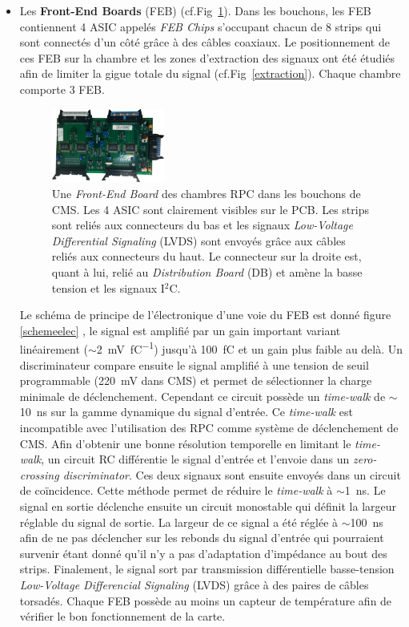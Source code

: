 \begin{itemize}[label=$\bullet$]
	\item Les \textbf{Front-End Boards} (FEB) (cf.Fig~\ref{Feb}). Dans les bouchons, les FEB contiennent \num{4} ASIC appelés \textit{FEB Chips} s'occupant chacun de \num{8} strips qui sont connectés d'un côté grâce à des câbles coaxiaux. Le positionnement de ces FEB sur la chambre et les zones d'extraction des signaux ont été étudiés afin de limiter la gigue totale du signal (cf.Fig~\ref{extraction}). Chaque chambre comporte \num{3} FEB.
	
	\begin{figure}[ht!]
		\centering
		\includegraphics[width=0.35\textwidth]{RPC/Feb.png}
		\captionsetup{type=subfigure}\caption{Une \textit{Front-End Board }des chambres RPC dans les bouchons de CMS. Les \num{4} ASIC sont clairement visibles sur le PCB. Les strips sont reliés aux connecteurs du bas et les signaux \textit{Low-Voltage Differential Signaling} (LVDS) sont envoyés grâce aux câbles reliés aux connecteurs du haut. Le connecteur sur la droite est, quant à lui, relié au \textit{Distribution Board} (DB) et amène la basse tension et les signaux I$^2$C.}
		\label{Feb}
	\end{figure}

	Le schéma de principe de l'électronique d'une voie du FEB est donné figure \ref{schemeelec} \cite{electro}, le signal est amplifié par un gain important variant linéairement ($\sim$\SI{2}{\milli\volt\per\femto\coulomb}) jusqu'à \SI{100}{\femto\coulomb} et un gain plus faible au delà. Un discriminateur compare ensuite le signal amplifié à une tension de seuil programmable (\SI{220}{\milli\volt} dans CMS) et permet de sélectionner la charge minimale de déclenchement. Cependant ce circuit possède un \textit{time-walk} de $\sim$\SI{10}{\nano\second} sur la gamme dynamique du signal d'entrée. Ce \textit{time-walk} est incompatible avec l'utilisation des RPC comme système de déclenchement de CMS. Afin d'obtenir une bonne résolution temporelle en limitant le \textit{time-walk}, un circuit RC différentie le signal d'entrée et l'envoie dans un \textit{zero-crossing discriminator}. Ces deux signaux sont ensuite envoyés dans un circuit de coïncidence. Cette méthode permet de réduire le \textit{time-walk} à $\sim$\SI{1}{\nano\second}. Le signal en sortie déclenche ensuite un circuit monostable qui définit la largeur réglable du signal de sortie. La largeur de ce signal a été réglée à $\sim$\SI{100}{\nano\second} afin de ne pas déclencher sur les rebonds du signal d'entrée qui pourraient survenir étant donné qu'il n'y a pas d'adaptation d'impédance au bout des strips. Finalement, le signal sort par transmission différentielle basse-tension \textit{Low-Voltage Differencial Signaling} (LVDS) grâce à des paires de câbles torsadés. Chaque FEB possède au moins un capteur de température afin de vérifier le bon fonctionnement de la carte.
	

\end{itemize}
